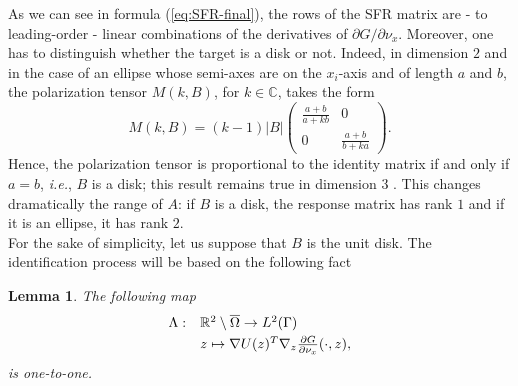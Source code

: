 \documentclass[final]{siamltex}
\newcommand{\nm}{\noalign{\smallskip}}
\numberwithin{equation}{section}
\numberwithin{figure}{section}
\numberwithin{table}{section}
\newtheorem{lem}{Lemma}
\begin{document}
As we can see in formula (\ref{eq:SFR-final}), the rows of the SFR
matrix are - to leading-order - linear combinations of the
derivatives of $\partial G/\partial\nu_{x}$. Moreover, one has to
distinguish whether the target is a disk or not. Indeed, in
dimension $2$ and in the case of an ellipse whose semi-axes are on
the $x_{i}$-axis and of length $a$ and $b$, the polarization
tensor $M(k,B)$, for $k\in \mathbb{C}$,  takes the form
\cite{milton_book}
\[
M(k,B)=(k-1)\vert B\vert\left(\begin{array}{cc}
\frac{a+b}{a+kb} & 0\\
0 & \frac{a+b}{b+ka}
\end{array}\right).
\]
Hence, the polarization tensor is proportional to the identity
matrix if and only if $a=b$, \emph{i.e.}, $B$ is a disk; this
result remains true in dimension $3$
\cite{ammari2007polarization}. This changes dramatically the range
of $A$: if $B$ is a disk, the response matrix
has rank $1$ and if it is an ellipse, it has rank $2$.\\
For the sake of simplicity, let us suppose that $B$ is the unit disk.
The identification process will be based on the following fact

\begin{lem}\label{lem:one-to-one}The following map
\[\begin{array}{ll}
\Lambda: &\mathbb{R}^{2}\setminus\overline{\Omega} \rightarrow  L^{2}(\Gamma)\\
\nm &z \mapsto  \nabla U(z)^T \nabla_{z}\frac{\partial
G}{\partial\nu_{x}}(\cdot,z),
\end{array}
\]
is one-to-one.\end{lem}

\proof
\end{document}
